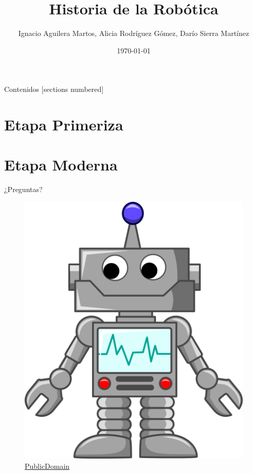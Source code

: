 \documentclass[10pt]{beamer}
\title{Historia de la Robótica}
\author{Ignacio Aguilera Martos, Alicia Rodríguez Gómez, Darío Sierra Martínez}
\date{\today}
\institute{Historia de las Matemáticas \\ \href{https://github.com/nacheteam/Historia-Robotica}{Trabajo completo en GitHub}}
\begin{document}
\maketitle

\begin{frame}[fragile]{Contenidos}
  [sections numbered]
  \tableofcontents[hideallsubsections]
\end{frame}

\section{Etapa Primeriza}


\section{Etapa Moderna}



\begin{frame}[standout]
	\LARGE{¿Preguntas?}
	\vspace{10px}
	\begin{figure}
		\includegraphics[scale=0.3]{./Imagenes/preguntas.png}
		\caption*{\href{http://www.publicdomainfiles.com/show_file.php?id=13539934212140}{PublicDomain}}
	\end{figure}
\end{frame}
\end{document}
